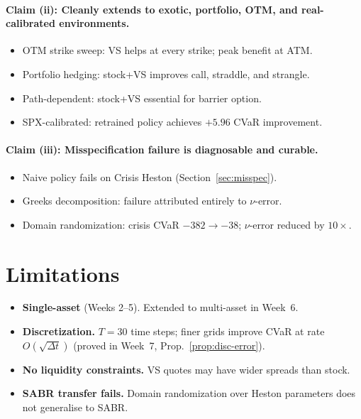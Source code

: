 \documentclass[11pt, a4paper]{article}
\begin{document}
\paragraph{Claim (ii): Cleanly extends to exotic, portfolio, OTM, and real-calibrated environments.}
\begin{itemize}[leftmargin=*]
  \item OTM strike sweep: VS helps at every strike; peak benefit at ATM.
  \item Portfolio hedging: stock+VS improves call, straddle, and strangle.
  \item Path-dependent: stock+VS essential for barrier option.
  \item SPX-calibrated: retrained policy achieves $+5.96$ CVaR improvement.
\end{itemize}

\paragraph{Claim (iii): Misspecification failure is diagnosable and curable.}
\begin{itemize}[leftmargin=*]
  \item Naive policy fails on Crisis Heston (Section~\ref{sec:misspec}).
  \item Greeks decomposition: failure attributed entirely to $\nu$-error.
  \item Domain randomization: crisis CVaR $-382 \to -38$; $\nu$-error
        reduced by $10\times$.
\end{itemize}


\section{Limitations}
\label{sec:limitations}

\begin{itemize}[leftmargin=*]
  \item \textbf{Single-asset} (Weeks 2--5). Extended to multi-asset in Week~6.
  \item \textbf{Discretization.} $T = 30$ time steps; finer grids improve CVaR
        at rate $O(\sqrt{\Delta t})$ (proved in Week~7, Prop.~\ref{prop:disc-error}).
  \item \textbf{No liquidity constraints.} VS quotes may have wider spreads than stock.
  \item \textbf{SABR transfer fails.} Domain randomization over Heston parameters
        does not generalise to SABR.
\end{itemize}
\end{document}
